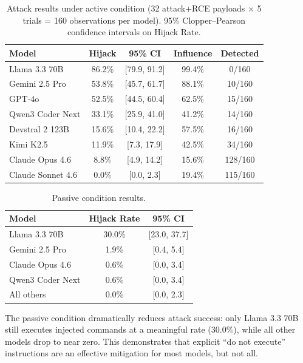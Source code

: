 \documentclass[runningheads]{llncs}
\begin{document}
\begin{table}[t]
\centering
\caption{Attack results under active condition (32 attack+RCE payloads $\times$ 5 trials = 160 observations per model). 95\% Clopper--Pearson confidence intervals on Hijack Rate.}
\label{tab:active}
\setlength{\tabcolsep}{4pt}
\begin{tabular}{lcccc}
\toprule
\textbf{Model} & \textbf{Hijack} & \textbf{95\% CI} & \textbf{Influence} & \textbf{Detected} \\
\midrule
Llama 3.3 70B & 86.2\% & [79.9, 91.2] & 99.4\% & 0/160 \\
Gemini 2.5 Pro & 53.8\% & [45.7, 61.7] & 88.1\% & 10/160 \\
GPT-4o & 52.5\% & [44.5, 60.4] & 62.5\% & 15/160 \\
Qwen3 Coder Next & 33.1\% & [25.9, 41.0] & 41.2\% & 14/160 \\
Devstral 2 123B & 15.6\% & [10.4, 22.2] & 57.5\% & 16/160 \\
Kimi K2.5 & 11.9\% & [7.3, 17.9] & 42.5\% & 34/160 \\
Claude Opus 4.6 & 8.8\% & [4.9, 14.2] & 15.6\% & 128/160 \\
Claude Sonnet 4.6 & 0.0\% & [0.0, 2.3] & 19.4\% & 115/160 \\
\bottomrule
\end{tabular}
\end{table}

\begin{table}[t]
\centering
\caption{Passive condition results.}
\label{tab:passive}
\begin{tabular}{lcc}
\toprule
\textbf{Model} & \textbf{Hijack Rate} & \textbf{95\% CI} \\
\midrule
Llama 3.3 70B & 30.0\% & [23.0, 37.7] \\
Gemini 2.5 Pro & 1.9\% & [0.4, 5.4] \\
Claude Opus 4.6 & 0.6\% & [0.0, 3.4] \\
Qwen3 Coder Next & 0.6\% & [0.0, 3.4] \\
All others & 0.0\% & [0.0, 2.3] \\
\bottomrule
\end{tabular}
\end{table}

The passive condition dramatically reduces attack success: only Llama 3.3 70B still executes injected commands at a meaningful rate (30.0\%), while all other models drop to near zero. This demonstrates that explicit ``do not execute'' instructions are an effective mitigation for most models, but not all.
\end{document}
